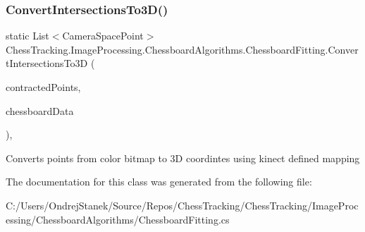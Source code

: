 \subsubsection{\texorpdfstring{ConvertIntersectionsTo3D()}{ConvertIntersectionsTo3D()}}
{\footnotesize\ttfamily static List$<$Camera\+Space\+Point$>$ Chess\+Tracking.\+Image\+Processing.\+Chessboard\+Algorithms.\+Chessboard\+Fitting.\+Convert\+Intersections\+To3D (\begin{DoxyParamCaption}\item[{List$<$ Point2D $>$}]{contracted\+Points,  }\item[{\mbox{\hyperlink{class_chess_tracking_1_1_image_processing_1_1_pipeline_data_1_1_chessboard_tracking_complete_data}{Chessboard\+Tracking\+Complete\+Data}}}]{chessboard\+Data }\end{DoxyParamCaption})\hspace{0.3cm}{\ttfamily [static]}, {\ttfamily [private]}}



Converts points from color bitmap to 3D coordintes using kinect defined mapping 



The documentation for this class was generated from the following file\+:\begin{DoxyCompactItemize}
\item 
C\+:/\+Users/\+Ondrej\+Stanek/\+Source/\+Repos/\+Chess\+Tracking/\+Chess\+Tracking/\+Image\+Processing/\+Chessboard\+Algorithms/Chessboard\+Fitting.\+cs\end{DoxyCompactItemize}
